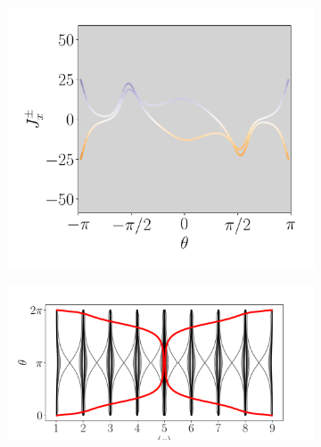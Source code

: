 \begin{figure}[h!]
     
     \begin{minipage}[h!]{1\textwidth}
         \begin{subfigure}[b!]{0.37 \textwidth}
             \caption{}
             \includegraphics[width=\textwidth]{Imagenes/Resultados_pump_Cuadrado/x/current_square_pump_pnx.pdf}
             \label{}
         \end{subfigure}\hspace{-0.5em}
         \begin{subfigure}[b!]{0.63 \textwidth}
             \caption{}
             \includegraphics[width=\textwidth]{Imagenes/Resultados_pump_Cuadrado/x/wannier_centerx.pdf}
             \label{}
         \end{subfigure}\hspace*{-0.5em}
     \end{minipage}\vspace*{-1em}
     
     
    \caption{}
    \label{fig:Pump_cuadrado_x}
\end{figure}